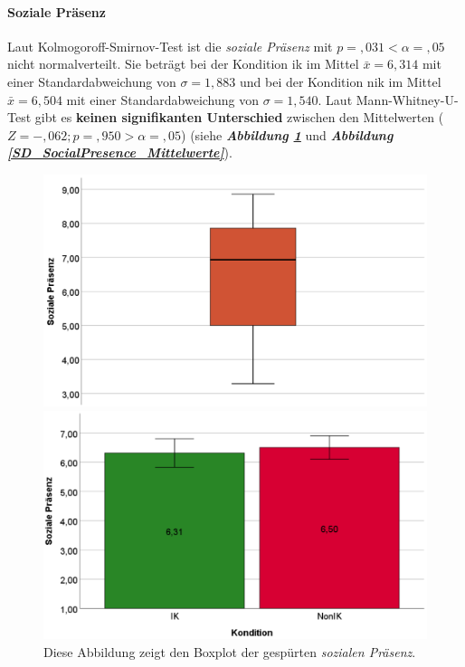 \documentclass[a4paper,11pt]{article}%
\renewcommand{\\}{\vspace*{0.5\baselineskip} \newline}
\begin{document}
{\paragraph{Soziale Präsenz} 
Laut Kolmogoroff-Smirnov-Test ist die \textit{soziale Präsenz} mit $p =,031 < \alpha = ,05$ nicht normalverteilt. 
Sie beträgt bei der Kondition \ac{ik} im Mittel $\bar{x} = 6,314$ mit einer Standardabweichung von $\sigma = 1,883$ und
bei der Kondition \ac{nik} im Mittel $\bar{x} = 6,504$ mit einer Standardabweichung von $\sigma = 1,540$. 
Laut Mann-Whitney-U-Test gibt es \textbf{keinen signifikanten Unterschied} zwischen den Mittelwerten ($ Z = -,062; p =,950 > \alpha = ,05$) (siehe \textbf{\textit{Abbildung \ref{BP_SocialPresence}}} und \textbf{\textit{Abbildung \ref{SD_SocialPresence_Mittelwerte}}}).
	
		\begin{figure}[H]
   \begin{minipage}[t]{.5\linewidth} %
      \includegraphics[width=\linewidth]{Abbildungen/AuswertungDiagramme/Final/BP_SocialPresence.png}
      \caption[Boxplot der gespürten sozialen Präsenz]{Diese Abbildung zeigt den Boxplot der gespürten \textit{sozialen Präsenz}.}
            \label{BP_SocialPresence}
   \end{minipage}
   \hspace{.02\linewidth}%
   \begin{minipage}[t]{.5\linewidth} %
     \includegraphics[width=\linewidth]{Abbildungen/AuswertungDiagramme/Final/SD_SocialPresence_Mittelwerte.png}

\end{minipage}
\end{figure}}
\end{document}
